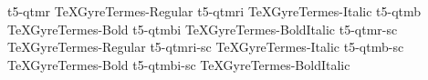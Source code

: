 \documentclass[test]{vnsample}
\begin{document}
\begin{shortsample}
    {t5-qtmr}     {TeXGyreTermes-Regular}
   {t5-qtmri}    {TeXGyreTermes-Italic}
    {t5-qtmb}     {TeXGyreTermes-Bold}
   {t5-qtmbi}    {TeXGyreTermes-BoldItalic}
   {t5-qtmr-sc}  {TeXGyreTermes-Regular}
 {t5-qtmri-sc} {TeXGyreTermes-Italic}
   {t5-qtmb-sc}  {TeXGyreTermes-Bold}
 {t5-qtmbi-sc} {TeXGyreTermes-BoldItalic}
\end{shortsample}
\end{document}

